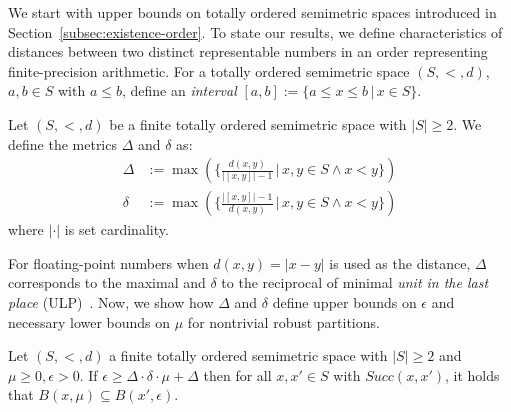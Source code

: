 We start with upper bounds on totally ordered semimetric spaces introduced in Section~\ref{subsec:existence-order}. To state our results, we define characteristics of distances between two distinct representable numbers in an order representing finite-precision arithmetic. For a totally ordered semimetric space $(S,<,d)$, $a, b \in S$ with $a \leq b$, define an \textit{interval} $[a, b] := \{a \leq x \leq b\,|\,x \in S\}$.
\begin{definition}
\label{def:precision_gap}
    Let $(S, <, d)$ be a finite totally ordered semimetric space with $|S| \geq 2$. We define the metrics $\Delta$ and $\delta$ as:
    \begin{align*}
        \Delta &:= \max(\{\frac{d(x,y)}{|[x,y]| -1}\,|\,x, y \in S \wedge x < y\}) \\
        \delta &:= \max(\{\frac{|[x,y]| - 1}{d(x,y)}\,|\,x, y \in S \wedge x < y\})
    \end{align*}
    where $|\cdot|$ is set cardinality.
\end{definition}
For floating-point numbers when $d(x,y) = |x - y|$ is used as the distance, $\Delta$ corresponds to the maximal and $\delta$ to the reciprocal of minimal \emph{unit in the last place} (ULP)~\cite{deDinechin2024}. Now, we show how $\Delta$ and $\delta$ define upper bounds on $\epsilon$ and necessary lower bounds on $\mu$ for nontrivial robust partitions.
\begin{theorem}
\label{thm:bounds-total}
    Let $(S, <, d)$ a finite totally ordered semimetric space with $|S| \geq 2$ and $\mu \geq 0, \epsilon > 0$. If $\epsilon \geq \Delta \cdot \delta \cdot \mu + \Delta$ then for all $x, x' \in S$ with $Succ(x,x')$, it holds that $B(x, \mu) \subseteq B(x', \epsilon)$. 
\end{theorem}
